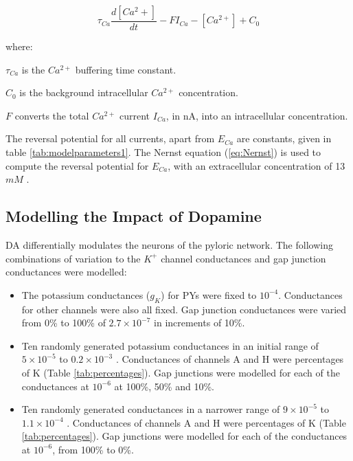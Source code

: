 \begin{equation}
\label{eq:KCa_concentration}
\tau_{Ca}\frac{d[Ca^2+]}{dt}-FI_{Ca}-[Ca^{2+}] + C_{0} 
\end{equation}

where:

$\tau_{Ca}$ is the $Ca^{2+}$ buffering time constant.

$C_{0}$ is the background intracellular $Ca^{2+}$ concentration.

$F$ converts the total $Ca^{2+}$ current $I_{Ca}$, in nA, into an intracellular concentration. 


The reversal potential for all currents, apart from $E_{Ca}$ are constants, given in table \ref{tab:modelparameters1}. The Nernst equation (\ref{eq:Nernst}) is used to compute the reversal potential for $E_{Ca}$, with an extracellular concentration of 13 $mM$ \cite{Buchholtz1992, Soto-Trevino2005}.



\subsection{Modelling the Impact of Dopamine}

\Ac{DA} differentially modulates the neurons of the pyloric network. The following combinations of variation to the $K^{+}$ channel conductances and gap junction conductances were modelled:

\begin{itemize}
\item The potassium conductances ($g_{K}$) for \acp{PY} were fixed to $10^{-4}$. Conductances for other channels were also all fixed. Gap junction conductances were varied from 0\% to 100\% of $2.7\times10^{-7}$ in increments of 10\%. 
\item Ten randomly generated potassium conductances in an initial range of $5\times10^{-5}$ to $0.2\times10^{-3}$ . Conductances of channels A and H were percentages of K (Table \ref{tab:percentages}). Gap junctions were modelled for each of the conductances at $10^{-6}$ at 100\%, 50\% and 10\%.
\item Ten randomly generated conductances in a narrower range of $9\times10^{-5}$ to $1.1\times10^{-4}$ . Conductances of channels A and H were percentages of K (Table \ref{tab:percentages}). Gap junctions were modelled for each of the conductances at $10^{-6}$, from 100\% to 0\%.
\end{itemize}


